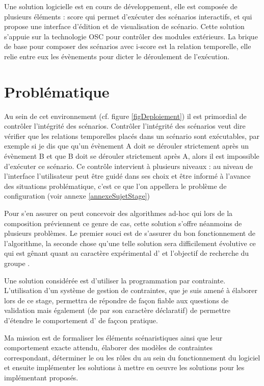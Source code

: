 Une solution logicielle est en cours de développement, elle est composée de plusieurs éléments : score qui permet d'exécuter des scénarios interactifs, et \iscore{} qui propose une interface d'édition et de visualisation de scénario. Cette solution s'appuie sur la technologie OSC pour contrôler des modules extérieurs. La brique de base pour composer des scénarios avec i-score est la relation temporelle, elle relie entre eux les évènements pour dicter le déroulement de l'exécution.



\section*{Problématique}

Au sein de cet environnement (cf. figure \ref{figDeploiement}) il est primordial de contrôler l'intégrité des scénarios. Contrôler l'intégrité des scénarios veut dire vérifier que les relations temporelles placés dans un scénario sont exécutables, par exemple si je dis que qu'un évènement A doit se dérouler strictement après un évènement B et que B doit se dérouler strictement après A, alors il est impossible d'exécuter ce scénario.
Ce contrôle intervient à plusieurs niveaux : au niveau de l'interface l'utilisateur peut être guidé dans ses choix et être informé à l'avance des situations problématique, c'est ce que l'on appellera le problème de configuration (voir annexe \ref{annexeSujetStage})

Pour s'en assurer on peut concevoir des algorithmes ad-hoc qui lors de la composition préviennent ce genre de cas, cette solution s'offre néanmoins de plusieurs problèmes. Le premier souci est de s'assurer du bon fonctionnement de l'algorithme, la seconde chose qu'une telle solution sera difficilement évolutive ce qui est gênant quant au caractère expérimental d'\iscore{} et l'objectif de recherche du groupe \ossia{}.

Une solution considérée est d'utiliser la programmation par contrainte. L'utilisation d'un système de gestion de contraintes, que je suis amené à élaborer lors de ce stage, permettra de répondre de façon fiable aux questions de validation mais également (de par son caractère déclaratif) de permettre d'étendre le comportement d'\iscore{} de façcon pratique.

Ma mission est de formaliser les éléments scénaristiques ainsi que leur comportement exacte attendu, élaborer des modèles de contraintes correspondant, déterminer le ou les rôles du \csp{} au sein du fonctionnement du logiciel et ensuite implémenter les solutions à mettre en oeuvre les solutions pour les implémentant proposés.

